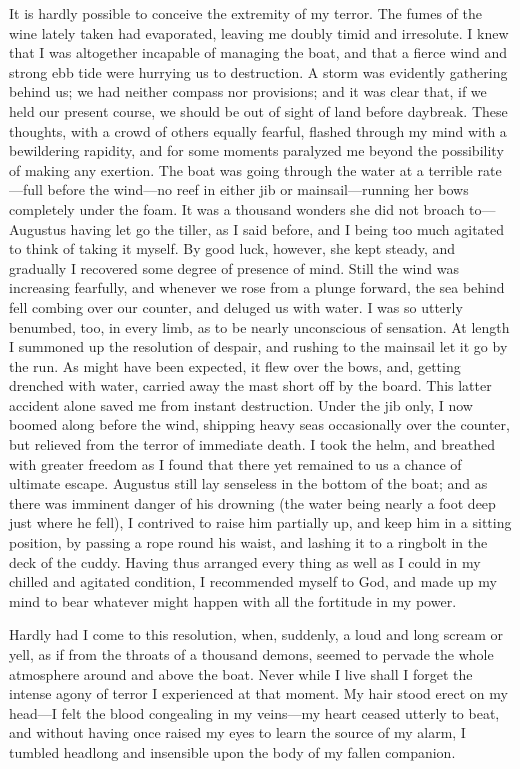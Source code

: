 It is hardly possible to conceive the extremity of my terror. The fumes of
the wine lately taken had evaporated, leaving me doubly timid and irresolute. I
knew that I was altogether incapable of managing the boat, and that a fierce
wind and strong ebb tide were hurrying us to destruction. A storm was evidently
gathering behind us; we had neither compass nor provisions; and it was clear
that, if we held our present course, we should be out of sight of land before
daybreak. These thoughts, with a crowd of others equally fearful, flashed
through my mind with a bewildering rapidity, and for some moments paralyzed me
beyond the possibility of making any exertion. The boat was going through the
water at a terrible rate---full before the wind---no reef in either jib or
mainsail---running her bows completely under the foam. It was a thousand wonders
she did not broach to---Augustus having let go the tiller, as I said before, and
I being too much agitated to think of taking it myself. By good luck, however,
she kept steady, and gradually I recovered some degree of presence of mind.
Still the wind was increasing fearfully, and whenever we rose from a plunge
forward, the sea behind fell combing over our counter, and deluged us with
water. I was so utterly benumbed, too, in every limb, as to be nearly
unconscious of sensation. At length I summoned up the resolution of despair, and
rushing to the mainsail let it go by the run. As might have been expected, it
flew over the bows, and, getting drenched with water, carried away the mast
short off by the board. This latter accident alone saved me from instant
destruction. Under the jib only, I now boomed along before the wind, shipping
heavy seas occasionally over the counter, but relieved from the terror of
immediate death. I took the helm, and breathed with greater freedom as I found
that there yet remained to us a chance of ultimate escape. Augustus still lay
senseless in the bottom of the boat; and as there was imminent danger of his
drowning (the water being nearly a foot deep just where he fell), I contrived to
raise him partially up, and keep him in a sitting position, by passing a rope
round his waist, and lashing it to a ringbolt in the deck of the cuddy. Having
thus arranged every thing as well as I could in my chilled and agitated
condition, I recommended myself to God, and made up my mind to bear whatever
might happen with all the fortitude in my power. 

Hardly had I come to this resolution, when, suddenly, a loud and long scream
or yell, as if from the throats of a thousand demons, seemed to pervade the
whole atmosphere around and above the boat. Never while I live shall I forget
the intense agony of terror I experienced at that moment. My hair stood erect on
my head---I felt the blood congealing in my veins---my heart ceased utterly to
beat, and without having once raised my eyes to learn the source of my alarm, I
tumbled headlong and insensible upon the body of my fallen companion. 

